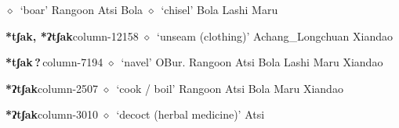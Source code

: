 \hspace{1ex}
         $\diamond$~`boar'
         Rangoon 
\hspace{1ex}
         Atsi 
\hspace{1ex}
         Bola 
\hspace{1ex}
         $\diamond$~`chisel'
         Bola 
\hspace{1ex}
         Lashi 
\hspace{1ex}
         Maru 
  \item {\footnotesize \textbf{*tʃak, *ʔtʃak}}{\tiny column-12158}
         $\diamond$~`unseam (clothing)'
         Achang\_Longchuan 
\hspace{1ex}
         Xiandao 
  \item {\footnotesize \textbf{*tʃak\,?\,}}{\tiny column-7194}
         $\diamond$~`navel'
         OBur. 
\hspace{1ex}
         Rangoon 
\hspace{1ex}
         Atsi 
\hspace{1ex}
         Bola 
\hspace{1ex}
         Lashi 
\hspace{1ex}
         Maru 
\hspace{1ex}
         Xiandao 
  \item {\footnotesize \textbf{*ʔtʃak}}{\tiny column-2507}
         $\diamond$~`cook / boil'
         Rangoon 
\hspace{1ex}
         Atsi 
\hspace{1ex}
         Bola 
\hspace{1ex}
         Maru 
\hspace{1ex}
         Xiandao 
  \item {\footnotesize \textbf{*ʔtʃak}}{\tiny column-3010}
         $\diamond$~`decoct (herbal medicine)'
         Atsi 
